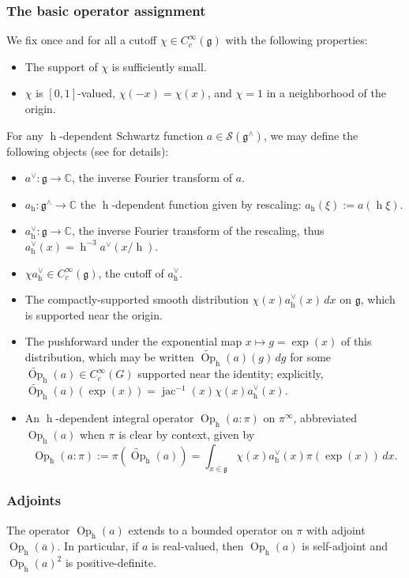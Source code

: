 \documentclass[reqno,10pt]{amsart}
\theoremstyle{plain} %
\theoremstyle{definition}
\theoremstyle{plain} %
\theoremstyle{remark}
\theoremstyle{itplain} %
\theoremstyle{remark} %
\numberwithin{equation}{section}
\DeclareMathOperator{\Opp}{Op}
\DeclareMathOperator{\h}{h}
\DeclareMathOperator{\jac}{jac}
\begin{document}
\subsubsection{The basic operator assignment}\label{sec:35ac3e5760}
We fix once and for all a cutoff $\chi \in C_c^\infty(\mathfrak{g})$ with the following properties:
\begin{itemize}
\item The support of $\chi$ is sufficiently small.
\item $\chi$ is $[0,1]$-valued, $\chi(-x) = \chi(x)$, and $\chi = 1$ in a neighborhood of the origin.
\end{itemize}
For any $\h$-dependent Schwartz function $a \in \mathcal{S}(\mathfrak{g}^\wedge)$, we may define the following objects (see \cite[\S2]{nelson-venkatesh-1} for details):
\begin{itemize}
\item $a^\vee : \mathfrak{g} \rightarrow \mathbb{C}$, the inverse Fourier transform of $a$.
\item $a_{\h} : \mathfrak{g}^\wedge \rightarrow \mathbb{C}$ the $\h$-dependent function given by rescaling: $a_{\h}(\xi) := a(\h \xi)$.
\item $a_{\h}^\vee : \mathfrak{g} \rightarrow \mathbb{C}$, the inverse Fourier transform of the rescaling, thus $a_{\h}^\vee(x) = \h^{-3} a^\vee(x/\h)$.
\item $\chi a_{\h}^\vee \in C_c^\infty(\mathfrak{g})$, the cutoff of $a_{\h}^\vee$.
\item The compactly-supported smooth distribution $\chi(x) a_{\h}^\vee (x) \, d x$ on $\mathfrak{g}$, which is supported near the origin.
\item The pushforward under the exponential map $x \mapsto g = \exp(x)$ of this distribution, which may be written $\widetilde{\Opp}_{\h}(a)(g) \, d g$ for some $\widetilde{\Opp}_{\h}(a) \in C_c^\infty(G)$ supported near the identity; explicitly, $\widetilde{\Opp}_{\h}(a)(\exp(x)) = \jac^{-1}(x) \chi(x) a_{\h}^\vee(x)$.
\item An $\h$-dependent integral operator $\Opp_{\h}(a:\pi)$ on $\pi^\infty$, abbreviated $\Opp_{\h}(a)$ when $\pi$ is clear by context, given by
  \[
    \Opp_{\h}(a:\pi) := \pi( \widetilde{\Opp}_{\h}(a) ) = \int_{x \in \mathfrak{g}} \chi(x) a_{\h}^\vee(x) \pi(\exp(x)) \, d x.
  \]
\end{itemize}

\subsubsection{Adjoints}\label{sec:35ac3e5763}
The operator $\Opp_{\h}(a)$ extends to a bounded operator on $\pi$ with adjoint $\Opp_{\h}(\overline{a})$.  In particular, if $a$ is real-valued, then $\Opp_{\h}(a)$ is self-adjoint and $\Opp_{\h}(a)^2$ is positive-definite.
\end{document}
